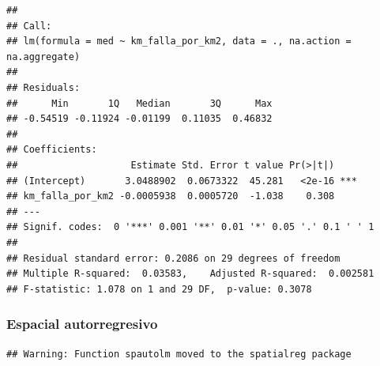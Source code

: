 \documentclass[11pt,]{article}
\newenvironment{Shaded}{\begin{snugshade}}{\end{snugshade}}
\newcommand{\KeywordTok}[1]{\textcolor[rgb]{0.13,0.29,0.53}{\textbf{#1}}}
\newcommand{\DataTypeTok}[1]{\textcolor[rgb]{0.13,0.29,0.53}{#1}}
\newcommand{\StringTok}[1]{\textcolor[rgb]{0.31,0.60,0.02}{#1}}
\newcommand{\OperatorTok}[1]{\textcolor[rgb]{0.81,0.36,0.00}{\textbf{#1}}}
\newcommand{\NormalTok}[1]{#1}
\begin{document}
\begin{Shaded}
\end{Shaded}

\begin{verbatim}
## 
## Call:
## lm(formula = med ~ km_falla_por_km2, data = ., na.action = na.aggregate)
## 
## Residuals:
##      Min       1Q   Median       3Q      Max 
## -0.54519 -0.11924 -0.01199  0.11035  0.46832 
## 
## Coefficients:
##                    Estimate Std. Error t value Pr(>|t|)    
## (Intercept)       3.0488902  0.0673322  45.281   <2e-16 ***
## km_falla_por_km2 -0.0005938  0.0005720  -1.038    0.308    
## ---
## Signif. codes:  0 '***' 0.001 '**' 0.01 '*' 0.05 '.' 0.1 ' ' 1
## 
## Residual standard error: 0.2086 on 29 degrees of freedom
## Multiple R-squared:  0.03583,    Adjusted R-squared:  0.002581 
## F-statistic: 1.078 on 1 and 29 DF,  p-value: 0.3078
\end{verbatim}

\subsubsection{Espacial autorregresivo}\label{espacial-autorregresivo}

\begin{Shaded}
\end{Shaded}

\begin{verbatim}
## Warning: Function spautolm moved to the spatialreg package
\end{verbatim}
\end{document}
